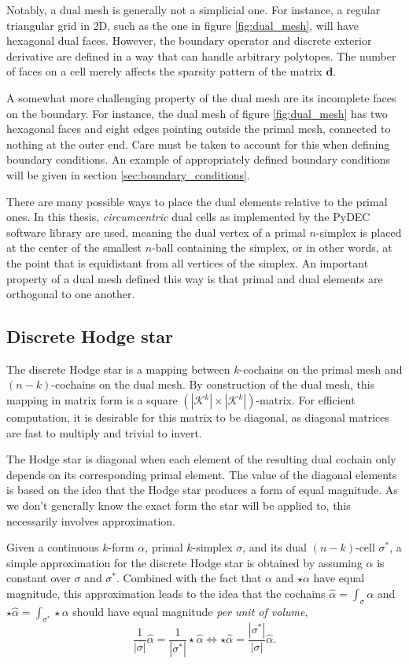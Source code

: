 \documentclass[utf8,english]{gradu3}
\begin{document}
Notably, a dual mesh is generally not a simplicial one.
For instance, a regular triangular grid in 2D,
such as the one in figure \ref{fig:dual_mesh}, will have hexagonal dual faces.
However, the boundary operator and discrete exterior derivative
are defined in a way that can handle arbitrary polytopes.
The number of faces on a cell merely affects the sparsity pattern
of the matrix $\mathbf{d}$.

A somewhat more challenging property of the dual mesh
are its incomplete faces on the boundary.
For instance, the dual mesh of figure \ref{fig:dual_mesh} has two hexagonal faces
and eight edges pointing outside the primal mesh, connected to nothing at the outer end.
Care must be taken to account for this when defining boundary conditions.
An example of appropriately defined boundary conditions
will be given in section \ref{sec:boundary_conditions}.

There are many possible ways to place the dual elements relative to the primal ones.
In this thesis, \textit{circumcentric} dual cells 
as implemented by the PyDEC software library \parencite{bell_pydec_2012} are used,
meaning the dual vertex of a primal $n$-simplex
is placed at the center of the smallest $n$-ball containing the simplex,
or in other words, at the point that is equidistant from
all vertices of the simplex.
An important property of a dual mesh defined this way is
that primal and dual elements are orthogonal to one another.

\subsection{Discrete Hodge star}

The discrete Hodge star is a mapping between $k$-cochains on the primal mesh
and $(n-k)$-cochains on the dual mesh.
By construction of the dual mesh,
this mapping in matrix form is a square $(|\mathcal{K}^k| \times |\mathcal{K}^k|)$-matrix.
For efficient computation, it is desirable for this matrix to be diagonal,
as diagonal matrices are fast to multiply and trivial to invert.

The Hodge star is diagonal when each element of the resulting dual cochain
only depends on its corresponding primal element.
The value of the diagonal elements is based on the idea
that the Hodge star produces a form of equal magnitude.
As we don't generally know the exact form the star will be applied to,
this necessarily involves approximation.

Given a continuous $k$-form $\alpha$, primal $k$-simplex $\sigma$,
and its dual $(n-k)$-cell $\sigma^*$,
a simple approximation for the discrete Hodge star
is obtained by assuming $\alpha$ is constant over $\sigma$ and $\sigma^*$.
Combined with the fact that $\alpha$ and $\star\alpha$ have equal magnitude,
this approximation leads to the idea that the cochains
$\hat{\alpha} = \int_{\sigma} \alpha$ and $\star\hat{\alpha} = \int_{\sigma^*} \star\alpha$
should have equal magnitude \textit{per unit of volume},
\[
  \frac{1}{|\sigma|} \hat{\alpha} = \frac{1}{|\sigma^*|} \star\hat{\alpha}
  \iff \star\hat{\alpha} = \frac{|\sigma^*|}{|\sigma|} \hat{\alpha}.
\]
\end{document}
